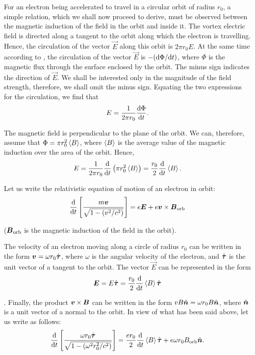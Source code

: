 For an electron being accelerated to travel in a circular orbit of radius $r_0$, a simple relation, which we shall now proceed to derive, must be observed between the magnetic induction of the field in the orbit and inside it.
The vortex electric field is directed along a tangent to the orbit along which the electron is travelling.
Hence, the circulation of the vector $\vec{E}$ along this orbit is $2\pi r_0E$.
At the same time according to , the circulation of the vector $\vec{E}$ is $-(\mathrm{d}\Phi/\mathrm{d} t)$, where $\Phi$ is the magnetic flux through the surface enclosed by the orbit.
The minus sign indicates the direction of $\vec{E}$.
We shall be interested only in the magnitude of the field strength, therefore, we shall omit the minus sign.
Equating the two expressions for the circulation, we find that
\begin{equation*}
    E = \frac{1}{2\pi r_0} \dfrac{\mathrm{d}\Phi}{\mathrm{d} t}.
\end{equation*}

\noindent
The magnetic field is perpendicular to the plane of the orbit.
We can, therefore, assume that $\Phi=\pi r^2_0\left\langle B \right\rangle$, where $\left\langle B \right\rangle$ is the average
value of the magnetic induction over the area of the orbit.
Hence,
\begin{equation}\label{eq:10_30}
    E = \frac{1}{2\pi r_0} \dfrac{\mathrm{d}}{\mathrm{d} t} \left( \pi r^2_0 \left\langle B \right\rangle\right) = \frac{r_0}{2} \dfrac{\mathrm{d}}{\mathrm{d} t} \left\langle B \right\rangle.
\end{equation}

Let us write the relativistic equation of motion of an electron in orbit:
\begin{equation}\label{eq:10_31}
    \dfrac{\mathrm{d}}{\mathrm{d} t}\left[ \frac{m \boldsymbol{v}}{\sqrt{1-\left(v^2/c^2\right)}} \right] = e \boldsymbol{E} + e \boldsymbol{v} \times \boldsymbol{B}_{\text{orb}}
\end{equation}

\noindent
($\boldsymbol{B}_{\text{orb}}$ is the magnetic induction of the field in the orbit).

The velocity of an electron moving along a circle of radius $r_0$ can be written in the form $\boldsymbol{v}=\omega r_0 \hat{\boldsymbol{\tau}}$, where $\omega$ is the angular velocity of the electron, and $\hat{\boldsymbol{\tau}}$ is the unit vector of a tangent to the orbit.
The vector $\vec{E}$ can be represented in the form
\begin{equation*}
    \boldsymbol{E} = E \hat{\boldsymbol{\tau}} = \frac{r_0}{2} \dfrac{\mathrm{d}}{\mathrm{d} t} \left\langle B \right\rangle \hat{\boldsymbol{\tau}}
\end{equation*}

.
Finally, the product $\boldsymbol{v}\times\boldsymbol{B}$ can be written in the form $vB\hat{\boldsymbol{n}}=\omega r_0 B\hat{\boldsymbol{n}}$, where $\hat{\boldsymbol{n}}$ is a unit vector of a normal to the orbit.
In view of what has been said above, let us write  as follows:
\begin{equation}\label{eq:10_32}
    \dfrac{\mathrm{d}}{\mathrm{d} t}\left[ \frac{\omega r_0 \hat{\boldsymbol{\tau}}}{\sqrt{1 - \left(\omega^2r_0^2/c^2\right)}} \right] = \frac{er_0}{2} \dfrac{\mathrm{d}}{\mathrm{d} t} \left\langle B \right\rangle \hat{\boldsymbol{\tau}} + e\omega r_0 B_{\text{orb}} \hat{\boldsymbol{n}}.
\end{equation}

